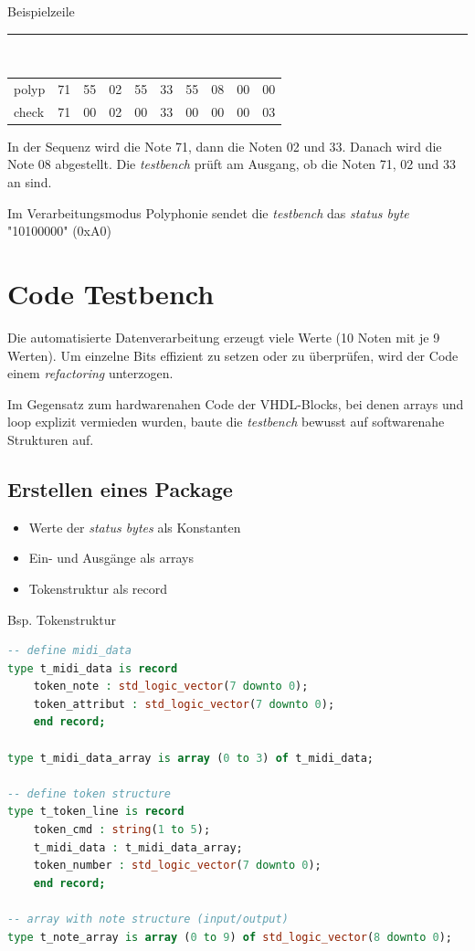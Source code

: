 Beispielzeile\\
\rule{\textwidth}{0.4pt}\\
{
\renewcommand{\arraystretch}{1.0} %
\begin{tabular*}{\textwidth}{@{}@{\extracolsep{\fill}}*{10}{l}@{}} %
polyp & 71 & 55 & 02 & 55 & 33 & 55 & 08 & 00 & 00\\
check & 71 & 00 & 02 & 00 & 33 & 00 & 00 & 00 & 03
\end{tabular*}
}

In der Sequenz wird die Note 71, dann die Noten 02 und 33. Danach wird die Note 08 abgestellt. Die \textit{testbench} prüft am Ausgang, ob die Noten 71, 02 und 33 an sind. 

Im Verarbeitungsmodus Polyphonie sendet die \textit{testbench}  das \textit{status byte} "10100000" (0xA0) 



\section{Code Testbench}\label{sec.code_testbench}
Die automatisierte Datenverarbeitung erzeugt viele Werte (10 Noten mit je 9 Werten). Um einzelne Bits effizient zu setzen oder zu überprüfen, wird der Code einem \textit{refactoring} unterzogen.

Im Gegensatz zum hardwarenahen Code der VHDL-Blocks, bei denen arrays und loop explizit vermieden wurden, baute die \textit{testbench} bewusst auf softwarenahe Strukturen auf.

\subsection{Erstellen eines Package}
\begin{itemize}
	\item Werte der \textit{status bytes} als Konstanten
	\item Ein- und Ausgänge als arrays
	\item Tokenstruktur als record
\end{itemize}

Bsp. Tokenstruktur

\begin{lstlisting}[language=vhdl]
-- define midi_data
type t_midi_data is record
    token_note : std_logic_vector(7 downto 0);
    token_attribut : std_logic_vector(7 downto 0);
    end record;

type t_midi_data_array is array (0 to 3) of t_midi_data;

-- define token structure
type t_token_line is record
    token_cmd : string(1 to 5);
    t_midi_data : t_midi_data_array;
    token_number : std_logic_vector(7 downto 0);
    end record;

-- array with note structure (input/output)
type t_note_array is array (0 to 9) of std_logic_vector(8 downto 0);
\end{lstlisting}


